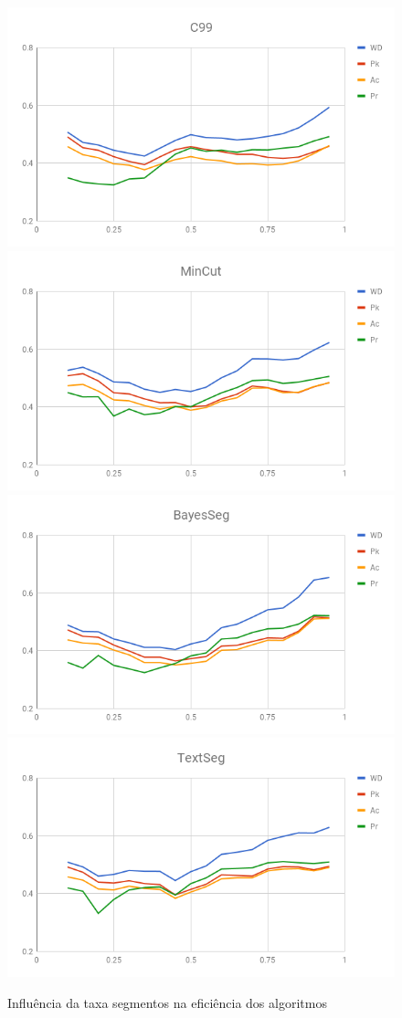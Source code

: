 \begin{figure}[!h] \centering     %
	  \includegraphics[width=.48\textwidth]{conteudo/capitulos/figs/graficos/analiseNSegRate-C99.png}
	  \includegraphics[width=.48\textwidth]{conteudo/capitulos/figs/graficos/analiseNSegRate-MinCut.png}
	  \includegraphics[width=.48\textwidth]{conteudo/capitulos/figs/graficos/analiseNSegRate-Bayes.png}
	  \includegraphics[width=.48\textwidth]{conteudo/capitulos/figs/graficos/analiseNSegRate-UISeg.png}
	\caption{Influência da taxa segmentos na eficiência dos algoritmos}
	\label{fig:influencia-SegRate}
\end{figure}






